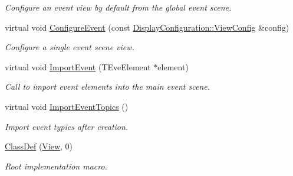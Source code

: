 \begin{DoxyCompactItemize}
\begin{DoxyCompactList}\small\item\em Configure an event view by default from the global event scene. \end{DoxyCompactList}\item 
virtual void \hyperlink{class_d_d4hep_1_1_view_a655dc004a93ab9caa56ee5a501bf492f}{Configure\+Event} (const \hyperlink{class_d_d4hep_1_1_display_configuration_1_1_view_config}{Display\+Configuration\+::\+View\+Config} \&config)
\begin{DoxyCompactList}\small\item\em Configure a single event scene view. \end{DoxyCompactList}\item 
virtual void \hyperlink{class_d_d4hep_1_1_view_a3fcf261f808c5ed9687f864286309123}{Import\+Event} (T\+Eve\+Element $\ast$element)
\begin{DoxyCompactList}\small\item\em Call to import event elements into the main event scene. \end{DoxyCompactList}\item 
virtual void \hyperlink{class_d_d4hep_1_1_view_a825772febdb79469f13b40dd0acbe03c}{Import\+Event\+Topics} ()
\begin{DoxyCompactList}\small\item\em Import event typics after creation. \end{DoxyCompactList}\item 
\hyperlink{class_d_d4hep_1_1_view_a35dcb8a29c90f0adeba81ad4215be551}{Class\+Def} (\hyperlink{class_d_d4hep_1_1_view}{View}, 0)
\begin{DoxyCompactList}\small\item\em Root implementation macro. \end{DoxyCompactList}\end{DoxyCompactItemize}
